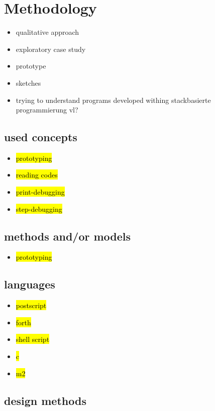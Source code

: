 \chapter{Methodology}

\begin{itemize}
\item qualitative approach
\item exploratory case study
\item prototype
\item sketches
\item trying to understand programs developed withing stackbasierte programmierung vl?
\end{itemize}

\section{used concepts}

\begin{itemize}
\item \hl{prototyping}
\item \hl{reading codes}
\item \hl{print-debugging}
\item \hl{step-debugging}
\end{itemize}

\section{methods and/or models}

\begin{itemize}
\item \hl{prototyping}
\end{itemize}

\section{languages}

\begin{itemize}
\item \hl{postscript}
\item \hl{forth}
\item \hl{shell script}
\item \hl{c}
\item \hl{m2}
\end{itemize}


\section{design methods}

